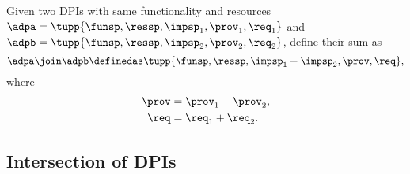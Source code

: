 \begin{definition}
    \label{def:parallel-1}
    Given two DPIs with same functionality and resources~$\adpa=\tupp{\funsp,\ressp,\impsp_{1},\prov_{1},\req_{1}}$ and~$\adpb=\tupp{\funsp,\ressp,\impsp_{2},\prov_{2},\req_{2}}$, define their sum as
    \begin{equation}
        \adpa\join\adpb\definedas\tupp{\funsp,\ressp,\impsp_{1}+\impsp_{2},\prov,\req} ,
    \end{equation}
    where
    \begin{equation}
        \begin{aligned}
            \prov & = \prov_1 + \prov_2, \\
            \req  & = \req_1 + \req_2.
        \end{aligned}
    \end{equation}

\end{definition}

%

\subsection{Intersection of DPIs}

\begin{marginfigure}
    \centering
    \caption{}
    \label{fig:intersection}
\end{marginfigure}

